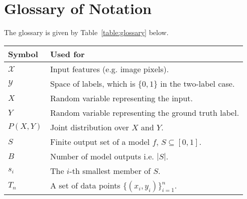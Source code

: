 \section{Glossary of Notation}

The glossary is given by Table~\ref{table:glossary} below.

\begin{table*}[h]
\centering
\begin{tabular}{l l}
\toprule
Symbol & Used for \\
\midrule
$\mathcal{X}$ & Input features (e.g. image pixels). \\
$\mathcal{Y}$ & Space of labels, which is $\{0, 1\}$ in the two-label case. \\
$X$ & Random variable representing the input. \\
$Y$ & Random variable representing the ground truth label. \\
$P(X, Y)$ & Joint distribution over $X$ and $Y$. \\
$S$ & Finite output set of a model $f$, $S \subseteq [0, 1]$. \\
$B$ & Number of model outputs i.e. $|S|$. \\
$s_i$ & The $i$-th smallest member of $S$. \\
$T_n$ & A set of data points $\{(x_i, y_i)\}_{i=1}^n$. \\



\end{tabular}
\caption{
	Glossary of variables and symbols used in this paper.
}
\label{table:glossary}
\end{table*}